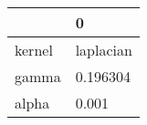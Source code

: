 \begin{tabular}{ll}
\toprule
{} &          0 \\
\midrule
kernel &  laplacian \\
gamma  &   0.196304 \\
alpha  &      0.001 \\
\bottomrule
\end{tabular}
